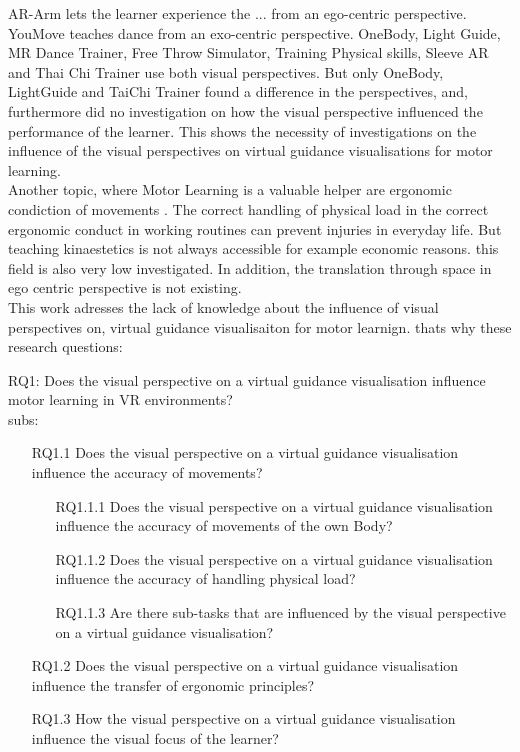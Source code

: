 AR-Arm  lets the learner experience the ... from an ego-centric perspective. YouMove teaches dance from an exo-centric perspective. OneBody, Light Guide, MR Dance Trainer, Free Throw Simulator, Training Physical skills, Sleeve AR and Thai Chi Trainer use both visual perspectives. But only OneBody, LightGuide and TaiChi Trainer found a difference in the perspectives, and, furthermore did no investigation on how the visual perspective influenced the performance of the learner. This shows the necessity of investigations on the influence of the visual perspectives on virtual guidance visualisations for motor learning.\\
Another topic, where Motor Learning is a valuable helper are ergonomic condiction of movements . The correct handling of physical load in the correct ergonomic conduct in working routines can prevent injuries in everyday life. But teaching kinaestetics is not always accessible for example economic reasons. this field is also very low investigated. In addition, the translation through space in ego centric perspective is not existing.\\
This work adresses the lack of knowledge about the influence of visual perspectives on,  virtual guidance visualisaiton for motor learnign. thats why these research questions:

RQ1: Does the visual perspective on a virtual guidance visualisation influence motor learning in VR environments?\\
subs: 
\begin{itemize}
	\item[RQ1.1] Does the visual perspective on a virtual guidance visualisation influence the accuracy of movements?
	\begin{itemize}
		\item[RQ1.1.1] Does the visual perspective on a virtual guidance visualisation influence the accuracy of movements of the own Body?
		\item[RQ1.1.2] Does the visual perspective on a virtual guidance visualisation influence the accuracy of handling physical load?
		\item[RQ1.1.3] Are there sub-tasks that are influenced by the visual perspective on a virtual guidance visualisation?
	\end{itemize}
	\item[RQ1.2] Does the visual perspective on a virtual guidance visualisation influence the transfer of ergonomic principles?
	\item[RQ1.3] How the visual perspective on a virtual guidance visualisation influence the visual focus of the learner?
\end{itemize}
\cite{Muckell}
